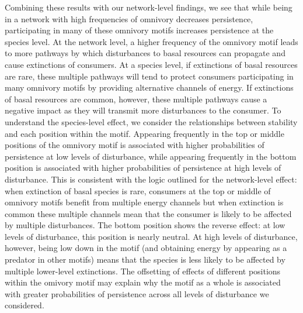 \documentclass[12pt]{article}
\begin{document}
\begin{spacing}{2.0}
Combining these results with our network-level findings, we see that while being in a network with high frequencies of omnivory decreases persistence, participating in many of these omnivory motifs increases persistence at the species level.
At the network level, a higher frequency of the omnivory motif leads to more pathways by which disturbances to basal resources can propagate and cause extinctions of consumers.
At a species level, if extinctions of basal resources are rare, these multiple pathways will tend to protect consumers participating in many omnivory motifs by providing alternative channels of energy.
If extinctions of basal resources are common, however, these multiple pathways cause a negative impact as they will transmit more disturbances to the consumer.
To understand the species-level effect, we consider the relationships between stability and each position within the motif.
Appearing frequently in the top or middle positions of the omnivory motif is associated with higher probabilities of persistence at low levels of disturbance, while appearing frequently in the bottom position is associated with higher probabilities of persistence at high levels of disturbance.
This is consistent with the logic outlined for the network-level effect: when extinction of basal species is rare, consumers at the top or middle of omnivory motifs benefit from multiple energy channels but when extinction is common these multiple channels mean that the consumer is likely to be affected by multiple disturbances.
The bottom position shows the reverse effect: at low levels of disturbance, this position is nearly neutral. 
At high levels of disturbance, however, being low down in the motif (and obtaining energy by appearing as a predator in other motifs) means that the species is less likely to be affected by multiple lower-level extinctions.
The offsetting of effects of different positions within the omivory motif may explain why the motif as a whole is associated with greater probabilities of persistence across all levels of disturbance we considered.



\end{spacing}
\end{document}
